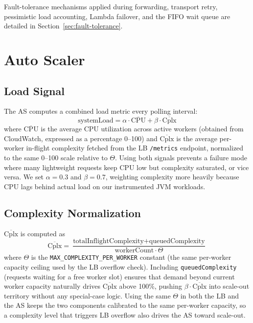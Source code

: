 \documentclass[10pt]{article}
\begin{document}
Fault-tolerance mechanisms applied during forwarding, transport retry,
pessimistic load accounting, Lambda failover, and the FIFO wait queue are detailed in Section~\ref{sec:fault-tolerance}.

\section{Auto Scaler}

\subsection{Load Signal}
The AS computes a combined load metric every polling interval:
\[
	\text{systemLoad} = \alpha \cdot \overline{\text{CPU}} + \beta \cdot \overline{\text{Cplx}}
\]
where $\overline{\text{CPU}}$ is the average CPU utilization across active
workers (obtained from CloudWatch, expressed as a percentage 0–100) and
$\overline{\text{Cplx}}$ is the average per-worker in-flight complexity fetched
from the LB \texttt{/metrics} endpoint, normalized to the same 0–100 scale
relative to $\Theta$. Using both signals prevents a failure mode where many
lightweight requests keep CPU low but complexity saturated, or vice versa. We
set $\alpha = 0.3$ and $\beta = 0.7$, weighting complexity more heavily because
CPU lags behind actual load on our instrumented JVM workloads.

\subsection{Complexity Normalization}

$\overline{\text{Cplx}}$ is computed as
\[
	\overline{\text{Cplx}} = \frac{\text{totalInflightComplexity} + \text{queuedComplexity}}{\text{workerCount} \cdot \Theta}
\]
where $\Theta$ is the \texttt{MAX\_COMPLEXITY\_PER\_WORKER} constant (the same
per-worker capacity ceiling used by the LB overflow check). Including
\texttt{queuedComplexity} (requests waiting for a free worker slot) ensures
that demand beyond current worker capacity naturally drives
$\overline{\text{Cplx}}$ above 100\%, pushing $\beta \cdot
	\overline{\text{Cplx}}$ into scale-out territory without any special-case
logic. Using the same $\Theta$ in both the LB and the AS keeps the two
components calibrated to the same per-worker capacity, so a complexity level
that triggers LB overflow also drives the AS toward scale-out.
\end{document}
